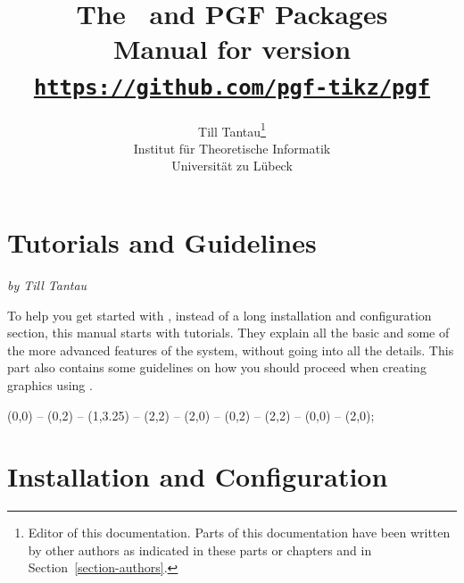 \title{\bfseries The \tikzname\ and {\Large PGF} Packages\\
  \large Manual for version \pgfversion\\[1mm]
\large\href{https://github.com/pgf-tikz/pgf}{\texttt{https://github.com/pgf-tikz/pgf}}}
\author{Till Tantau\footnote{Editor of this documentation. Parts of
    this documentation have been written by other authors as indicated
    in these parts or chapters and in Section~\ref{section-authors}.}\\
  \normalsize Institut für Theoretische Informatik\\[-1mm]
  \normalsize Universität zu Lübeck}

\maketitle
\label{table-of-contents}

\tableofcontents

\clearpage






\part{Tutorials and Guidelines}

{\Large \emph{by Till Tantau}}

\bigskip
\noindent To help you get started with \tikzname, instead of a long
installation and configuration section, this manual starts with tutorials. They
explain all the basic and some of the more advanced features of the system,
without going into all the details. This part also contains some guidelines on
how you should proceed when creating graphics using \tikzname.

\vskip3cm

\begin{codeexample}[graphic=white,width=0pt]
\tikz \draw[thick,rounded corners=8pt]
  (0,0) -- (0,2) -- (1,3.25) -- (2,2) -- (2,0) -- (0,2) -- (2,2) -- (0,0) -- (2,0);
\end{codeexample}











\part{Installation and Configuration}


